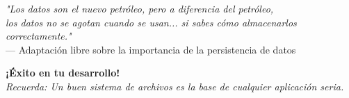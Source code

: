 \documentclass[11pt,letterpaper]{article}
\begin{document}
\vspace{1cm}

\begin{center}
\textit{"Los datos son el nuevo petróleo, pero a diferencia del petróleo,}\\
\textit{los datos no se agotan cuando se usan... si sabes cómo almacenarlos correctamente."}\\
\vspace{0.3cm}
--- Adaptación libre sobre la importancia de la persistencia de datos
\end{center}

\vspace{0.5cm}

\begin{center}
\textbf{¡Éxito en tu desarrollo!}\\
\textit{Recuerda: Un buen sistema de archivos es la base de cualquier aplicación seria.}
\end{center}
\end{document}
